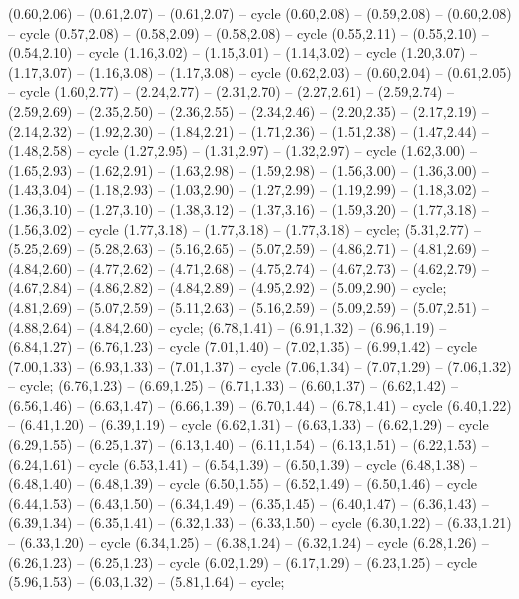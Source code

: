 { (0.60,2.06) -- (0.61,2.07) -- (0.61,2.07) -- cycle (0.60,2.08) -- (0.59,2.08) -- (0.60,2.08) -- cycle (0.57,2.08) -- (0.58,2.09) -- (0.58,2.08) -- cycle (0.55,2.11) -- (0.55,2.10) -- (0.54,2.10) -- cycle (1.16,3.02) -- (1.15,3.01) -- (1.14,3.02) -- cycle (1.20,3.07) -- (1.17,3.07) -- (1.16,3.08) -- (1.17,3.08) -- cycle (0.62,2.03) -- (0.60,2.04) -- (0.61,2.05) -- cycle (1.60,2.77) -- (2.24,2.77) -- (2.31,2.70) -- (2.27,2.61) -- (2.59,2.74) -- (2.59,2.69) -- (2.35,2.50) -- (2.36,2.55) -- (2.34,2.46) -- (2.20,2.35) -- (2.17,2.19) -- (2.14,2.32) -- (1.92,2.30) -- (1.84,2.21) -- (1.71,2.36) -- (1.51,2.38) -- (1.47,2.44) -- (1.48,2.58) -- cycle (1.27,2.95) -- (1.31,2.97) -- (1.32,2.97) -- cycle (1.62,3.00) -- (1.65,2.93) -- (1.62,2.91) -- (1.63,2.98) -- (1.59,2.98) -- (1.56,3.00) -- (1.36,3.00) -- (1.43,3.04) -- (1.18,2.93) -- (1.03,2.90) -- (1.27,2.99) -- (1.19,2.99) -- (1.18,3.02) -- (1.36,3.10) -- (1.27,3.10) -- (1.38,3.12) -- (1.37,3.16) -- (1.59,3.20) -- (1.77,3.18) -- (1.56,3.02) -- cycle (1.77,3.18) -- (1.77,3.18) -- (1.77,3.18) -- cycle;
 (5.31,2.77) -- (5.25,2.69) -- (5.28,2.63) -- (5.16,2.65) -- (5.07,2.59) -- (4.86,2.71) -- (4.81,2.69) -- (4.84,2.60) -- (4.77,2.62) -- (4.71,2.68) -- (4.75,2.74) -- (4.67,2.73) -- (4.62,2.79) -- (4.67,2.84) -- (4.86,2.82) -- (4.84,2.89) -- (4.95,2.92) -- (5.09,2.90) -- cycle;
 (4.81,2.69) -- (5.07,2.59) -- (5.11,2.63) -- (5.16,2.59) -- (5.09,2.59) -- (5.07,2.51) -- (4.88,2.64) -- (4.84,2.60) -- cycle;
 (6.78,1.41) -- (6.91,1.32) -- (6.96,1.19) -- (6.84,1.27) -- (6.76,1.23) -- cycle (7.01,1.40) -- (7.02,1.35) -- (6.99,1.42) -- cycle (7.00,1.33) -- (6.93,1.33) -- (7.01,1.37) -- cycle (7.06,1.34) -- (7.07,1.29) -- (7.06,1.32) -- cycle;
 (6.76,1.23) -- (6.69,1.25) -- (6.71,1.33) -- (6.60,1.37) -- (6.62,1.42) -- (6.56,1.46) -- (6.63,1.47) -- (6.66,1.39) -- (6.70,1.44) -- (6.78,1.41) -- cycle (6.40,1.22) -- (6.41,1.20) -- (6.39,1.19) -- cycle (6.62,1.31) -- (6.63,1.33) -- (6.62,1.29) -- cycle (6.29,1.55) -- (6.25,1.37) -- (6.13,1.40) -- (6.11,1.54) -- (6.13,1.51) -- (6.22,1.53) -- (6.24,1.61) -- cycle (6.53,1.41) -- (6.54,1.39) -- (6.50,1.39) -- cycle (6.48,1.38) -- (6.48,1.40) -- (6.48,1.39) -- cycle (6.50,1.55) -- (6.52,1.49) -- (6.50,1.46) -- cycle (6.44,1.53) -- (6.43,1.50) -- (6.34,1.49) -- (6.35,1.45) -- (6.40,1.47) -- (6.36,1.43) -- (6.39,1.34) -- (6.35,1.41) -- (6.32,1.33) -- (6.33,1.50) -- cycle (6.30,1.22) -- (6.33,1.21) -- (6.33,1.20) -- cycle (6.34,1.25) -- (6.38,1.24) -- (6.32,1.24) -- cycle (6.28,1.26) -- (6.26,1.23) -- (6.25,1.23) -- cycle (6.02,1.29) -- (6.17,1.29) -- (6.23,1.25) -- cycle (5.96,1.53) -- (6.03,1.32) -- (5.81,1.64) -- cycle;
}
